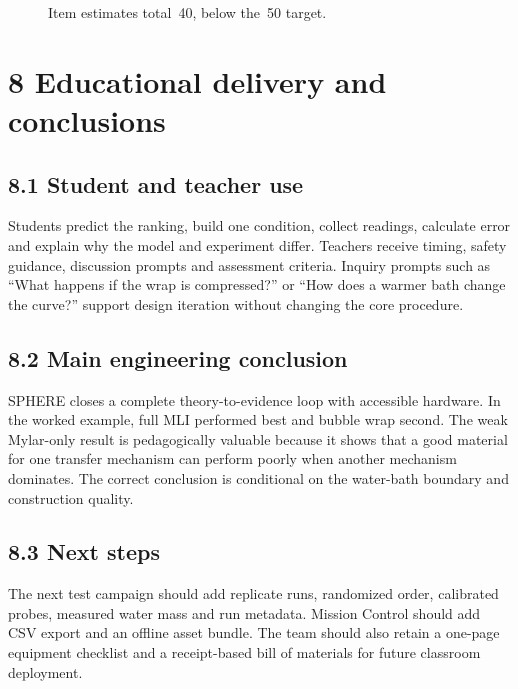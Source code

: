 \documentclass[9pt,a4paper]{extarticle}
\newcommand{\EUR}[1]{\texteuro\,#1}
\begin{document}
\begin{figure}[H]\centering
{}
\caption*{\small Item estimates total \EUR{40}, below the \EUR{50} target.}
\end{figure}
\section*{8 Educational delivery and conclusions}
\subsection*{8.1 Student and teacher use}
Students predict the ranking, build one condition, collect readings, calculate error and explain why the model and experiment differ. Teachers receive timing, safety guidance, discussion prompts and assessment criteria. Inquiry prompts such as ``What happens if the wrap is compressed?'' or ``How does a warmer bath change the curve?'' support design iteration without changing the core procedure.

\subsection*{8.2 Main engineering conclusion}
SPHERE closes a complete theory-to-evidence loop with accessible hardware. In the worked example, full MLI performed best and bubble wrap second. The weak Mylar-only result is pedagogically valuable because it shows that a good material for one transfer mechanism can perform poorly when another mechanism dominates. The correct conclusion is conditional on the water-bath boundary and construction quality.

\subsection*{8.3 Next steps}
The next test campaign should add replicate runs, randomized order, calibrated probes, measured water mass and run metadata. Mission Control should add CSV export and an offline asset bundle. The team should also retain a one-page equipment checklist and a receipt-based bill of materials for future classroom deployment.
\end{document}
